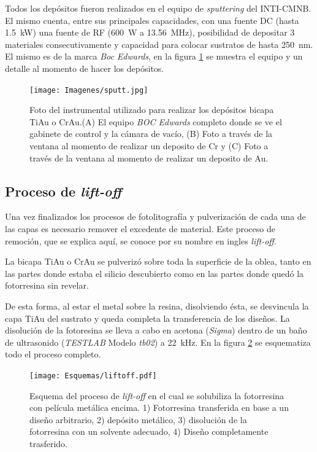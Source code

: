 		   	Todos los depósitos fueron realizados en el equipo de \textit{sputtering} del INTI-CMNB. El mismo cuenta, entre sus principales capacidades, con una fuente DC (hasta \SI{1.5}{\kW}) una fuente de RF (\SI{600}{W} a \SI{13.56}{\MHz}), posibilidad de depositar 3 materiales consecutivamente y capacidad para colocar sustratos de hasta \SI{250}{\nm}. El mismo es de la marca \textit{Boc Edwards}, en la figura \ref{fig:sputt} se muestra el equipo y un detalle al momento de hacer los depósitos.

		   		  \begin{figure}[b!]
				  \begin{center}
				  \texttt{[image: Imagenes/sputt.jpg]}
				  \caption[Equipo para depósito de películas delgadas, \textit{sputtering}]{Foto del instrumental utilizado para realizar los depósitos bicapa Ti\textbar Au o Cr\textbar Au.(A) El equipo \textit{BOC Edwards} completo donde se ve el gabinete de control y la cámara de vacío, (B) Foto a través de la ventana al momento de realizar un deposito de Cr y (C) Foto a través de la ventana al momento de realizar un deposito de Au.}
				  \label{fig:sputt}
				  \end{center}
				  \end{figure}

	\subsection{Proceso de\textit{ lift-off}}

   	     Una vez finalizados los procesos de fotolitografía y pulverización de cada una de las capas es necesario remover el excedente de material. Este proceso de remoción, que se explica aquí, se conoce por su nombre en ingles \textit{lift-off}.

		 La bicapa Ti\textbar Au o Cr\textbar Au se pulverizó sobre toda la superficie de la oblea, tanto en las partes donde estaba el silicio descubierto como en las partes donde quedó la fotorresina sin revelar. 
			
		 De esta forma, al estar el metal sobre la resina, disolviendo ésta, se desvincula la capa Ti\textbar Au del sustrato y queda completa la transferencia de los diseños. 
		 La disolución de la fotoresina se lleva a cabo en acetona (\textit{Sigma}) dentro de un baño de ultrasonido (\textit{TESTLAB} Modelo \textit{tb02}) a \SI{22}{\kHz}. En la figura \ref{esq:liftoff} se esquematiza todo el proceso completo.

		 \begin{figure}[h!]
			  \begin{center}
			  \texttt{[image: Esquemas/liftoff.pdf]}
			  \caption[Esquema del proceso de\textit{ lift-off}]{Esquema del proceso de\textit{ lift-off} en el cual se solubiliza la fotorresina con película metálica encima. 1) Fotorresina transferida en base a un diseño arbitrario, 2) depósito metálico, 3) disolución de la fotorresina con un solvente adecuado, 4) Diseño completamente trasferido.}
			  \label{esq:liftoff}
			  \end{center}
			  \end{figure}

